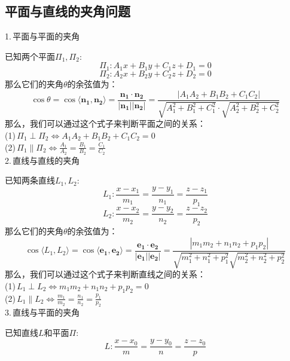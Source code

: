 \subsection{平面与直线的夹角问题}
1.$\,$平面与平面的夹角
\par 已知两个平面$\Pi_1,\Pi_2$:
\begin{equation}
	\nonumber
	\Pi_1:A_1x+B_1y+C_1z+D_1=0
\end{equation}
\begin{equation}
	\nonumber
	\Pi_2: A_2x+B_2y+C_2z+D_2=0
	\end{equation}
那么它们的夹角$\theta$的余弦值为：
\begin{equation}
	\cos \theta=\cos\langle \boldsymbol{n_1},\boldsymbol{n_2}\rangle =\frac{\boldsymbol{n_1}\cdot\boldsymbol{n_2}}{|\boldsymbol{n_1}||\boldsymbol{n_2}|}=\frac{|A_1A_2+B_1B_2+C_1C_2|}{\sqrt{A_1^2+B_1^2+C_1^2}\cdot\sqrt{A_2^2+B_2^2+C_2^2}}
\end{equation}
那么，我们可以通过这个式子来判断平面之间的关系：\\
(1)$\, \Pi_1\perp \Pi_2 \Leftrightarrow  A_1A_2+B_1B_2+C_1C_2=0$\\
(2)$\, \Pi_1\parallel \Pi_2 \Leftrightarrow \displaystyle \frac{A_1}{A_2}=\frac{B_1}{B_2}=\frac{C_1}{C_2} $\\
2.$\,$直线与直线的夹角
\par 已知两条直线$L_1,L_2$:
\begin{equation}
	L_1: \frac{x-x_1}{m_1}=\frac{y-y_1}{n_1}=\frac{z-z_1}{p_1}
\end{equation}
\begin{equation}
	L_2:\frac{x-x_2}{m_2}=\frac{y-y_2}{n_2}=\frac{z-z_2}{p_2}
\end{equation}
那么它们的夹角$\theta$的余弦值为：
\begin{equation}
\cos\langle L_1,L_2\rangle =\cos \langle \boldsymbol{e_1},\boldsymbol{e_2}\rangle =\frac{\boldsymbol{e_1}\cdot\boldsymbol{e_2}}{|\boldsymbol{e_1}||\boldsymbol{e_2}|}=\frac{|m_1m_2+n_1n_2+p_1p_2|}{\sqrt{m_1^2+n_1^2+p_1^2}\sqrt{m_2^2+n_2^2+p_2^2}}
\end{equation}
那么，我们可以通过这个式子来判断直线之间的关系：\\
(1)$\, L_1\perp L_2 \Leftrightarrow  m_1m_2+n_1n_2+p_1p_2=0$\\
(2)$\, L_1\parallel L_2 \Leftrightarrow \displaystyle \frac{m_1}{m_2}=\frac{n_1}{n_2}=\frac{p_1}{p_2} $\\
3.$\,$直线与平面的夹角
\par 已知直线$L$和平面$\Pi$:
\begin{equation}
	\nonumber
	L:\frac{x-x_0}{m}=\frac{y-y_0}{n}=\frac{z-z_0}{p}
\end{equation}
